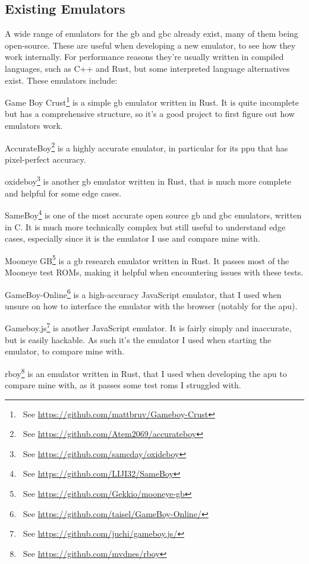 \documentclass[11pt]{informatics-report}
\newcommand{\ftnt}[1]{\footnote{~See \url{#1}}}
\begin{document}
\subsection{Existing Emulators}

A wide range of emulators for the \gls{gb} and \gls{gbc} already exist, many of them being open-source. These are useful when developing a new emulator, to see how they work internally. For performance reasons they're usually written in compiled languages, such as C++ and Rust, but some interpreted language alternatives exist. These emulators include:

\begin{compactitem}
    \item Game Boy Crust\ftnt{https://github.com/mattbruv/Gameboy-Crust} is a simple \gls{gb} emulator written in Rust. It is quite incomplete but has a comprehensive structure, so it's a good project to first figure out how emulators work.
    \item AccurateBoy\ftnt{https://github.com/Atem2069/accurateboy} is a highly accurate emulator, in particular for its \gls{ppu} that has pixel-perfect accuracy.
    \item oxideboy\ftnt{https://github.com/samcday/oxideboy} is another \gls{gb} emulator written in Rust, that is much more complete and helpful for some edge cases.
    \item SameBoy\ftnt{https://github.com/LIJI32/SameBoy} is one of the most accurate open source \gls{gb} and \gls{gbc} emulators, written in C. It is much more technically complex but still useful to understand edge cases, especially since it is the emulator I use and compare mine with.
    \item Mooneye GB\ftnt{https://github.com/Gekkio/mooneye-gb} is a \gls{gb} research emulator written in Rust. It passes most of the Mooneye test ROMs, making it helpful when encountering issues with these tests.
    \item GameBoy-Online\ftnt{https://github.com/taisel/GameBoy-Online/} is a high-accuracy JavaScript emulator, that I used when unsure on how to interface the emulator with the browser (notably for the \gls{apu}).
    \item Gameboy.js\ftnt{https://github.com/juchi/gameboy.js/} is another JavaScript emulator. It is fairly simply and inaccurate, but is easily hackable. As such it's the emulator I used when starting the emulator, to compare mine with.
    \item rboy\ftnt{https://github.com/mvdnes/rboy} is an emulator written in Rust, that I used when developing the \gls{apu} to compare mine with, as it passes some test \glspl{rom} I struggled with.
\end{compactitem}
\end{document}
